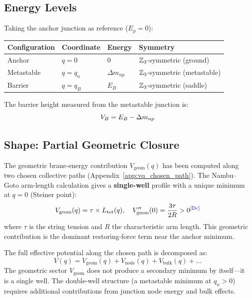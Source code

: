 \subsection{Energy Levels}

Taking the anchor junction as reference ($E_p = 0$):

\begin{center}
\begin{tabular}{llll}
\toprule
Configuration & Coordinate & Energy & Symmetry \\
\midrule
Anchor & $q = 0$ & $0$ & $\mathbb{Z}_3$-symmetric (ground) \\
Metastable & $q = q_n$ & $\Delta m_{np}$ & $\mathbb{Z}_3$-symmetric (metastable) \\
Barrier & $q = q_B$ & $E_B$ & $\mathbb{Z}_3$-symmetric (saddle) \\
\bottomrule
\end{tabular}
\end{center}

The barrier height measured from the metastable junction is:
\begin{equation}
    V_B = E_B - \Delta m_{np}
\end{equation}

\subsection{Shape: Partial Geometric Closure}

The geometric brane-energy contribution $V_{\mathrm{geom}}(q)$ has been
computed along two chosen collective paths
(Appendix~\ref{app:vq_chosen_path}). The Nambu--Goto arm-length
calculation gives a \textbf{single-well} profile with a unique minimum
at $q = 0$ (Steiner point):
\begin{equation}
    V_{\mathrm{geom}}(q) = \tau \times L_{\mathrm{tot}}(q), \quad
    V_{\mathrm{geom}}''(0) = \frac{3\tau}{2R} > 0
    \tagDc
\end{equation}
where $\tau$ is the string tension and $R$ the characteristic arm length.
This geometric contribution is the dominant restoring-force term near
the anchor minimum.

The full effective potential along the chosen path is decomposed as:
\begin{equation}
    V(q) = V_{\mathrm{geom}}(q) + V_{\mathrm{node}}(q)
         + V_{\mathrm{bulk}}(q) + \ldots
\end{equation}
The geometric sector $V_{\mathrm{geom}}$ does not produce a secondary
minimum by itself---it is a single well. The double-well structure
(a metastable minimum at $q_n > 0$) requires additional contributions
from junction node energy and bulk effects.


